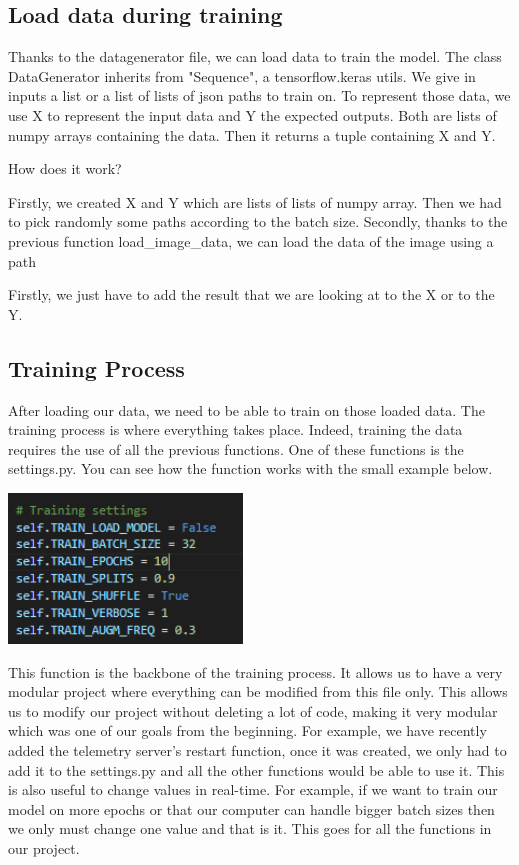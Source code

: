 \documentclass[12pt]{article}
\begin{document}
\subsection{Load data during training}
Thanks to the datagenerator file, we can load data to train the model. The class DataGenerator inherits from "Sequence", a tensorflow.keras utils. We give in inputs a list or a list of lists of json paths to train on. To represent those data, we use X to represent the input data and Y the expected outputs. Both are lists of numpy arrays containing the data. Then it returns a tuple containing X and Y.  

How does it work?  

Firstly, we created X and Y which are lists of lists of numpy array. Then we had to pick randomly some paths according to the batch size. Secondly, thanks to the previous function load\_image\_data, we can load the data of the image using a path

Firstly, we just have to add the result that we are looking at to the X or to the Y.

\subsection{Training Process}

After loading our data, we need to be able to train on those loaded data. The training process is where everything takes place. Indeed, training the data requires the use of all the previous functions. One of these functions is the settings.py. You can see how the function works with the small example below.

\centerline{\includegraphics[height=4cm]{../../docs/setting-train.png}}

This function is the backbone of the training process. It allows us to have a very modular project where everything can be modified from this file only. This allows us to modify our project without deleting a lot of code, making it very modular which was one of our goals from the beginning. For example, we have recently added the telemetry server's restart function, once it was created, we only had to add it to the settings.py and all the other functions would be able to use it.   
This is also useful to change values in real-time. For example, if we want to train our model on more epochs or that our computer can handle bigger batch sizes then we only must change one value and that is it. This goes for all the functions in our project. 
\end{document}
